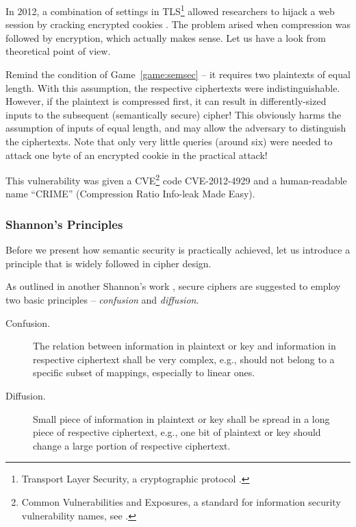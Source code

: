 \begin{example}
\label{ex:crime}
	In 2012, a combination of settings in TLS\footnote{Transport Layer Security, a cryptographic protocol \cite{dierks2008transport}.} allowed researchers to hijack a web session by cracking encrypted cookies \cite{goodin2012crime}. The problem arised when compression was followed by encryption, which actually makes sense. Let us have a look from theoretical point of view.
	
	Remind the condition of Game~\ref{game:semsec} -- it requires two plaintexts of equal length. With this assumption, the respective ciphertexts were indistinguishable. However, if the plaintext is compressed first, it can result in differently-sized inputs to the subsequent (semantically secure) cipher! This obviously harms the assumption of inputs of equal length, and may allow the adversary to distinguish the ciphertexts. Note that only very little queries (around six) were needed to attack one byte of an encrypted cookie in the practical attack!
	
	This vulnerability was given a CVE\footnote{Common Vulnerabilities and Exposures, a standard for information security vulnerability names, see .} code CVE-2012-4929 and a human-readable name ``CRIME'' (Compression Ratio Info-leak Made Easy).
\end{example}

\subsubsection{Shannon's Principles}
	
	Before we present how semantic security is practically achieved, let us introduce a principle that is widely followed in cipher design.
	
	\begin{princ}[Shannon]
	\label{pri:shannon}
		As outlined in another Shannon's work \cite{shannon1949communication}, secure ciphers are suggested to employ two basic principles -- {\em confusion} and {\em diffusion}.
		\begin{description}
			\item[Confusion.] The relation between information in plaintext or key and information in respective ciphertext shall be very complex, e.g., should not belong to a specific subset of mappings, especially to linear ones.
			\item[Diffusion.] Small piece of information in plaintext or key shall be spread in a long piece of respective ciphertext, e.g., one bit of plaintext or key should change a large portion of respective ciphertext.
		\end{description}
	\end{princ}
	

